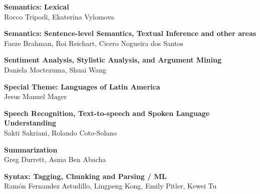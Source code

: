 \textbf{Semantics: Lexical} \\
\hspace*{0.2in} Rocco Tripodi, Ekaterina Vylomova

\textbf{Semantics: Sentence-level Semantics, Textual Inference and other areas} \\
\hspace*{0.2in} Faeze Brahman, Roi Reichart, Cicero Nogueira dos Santos

\textbf{Sentiment Analysis, Stylistic Analysis, and Argument Mining} \\
\hspace*{0.2in} Daniela Moctezuma, Shuai Wang

\textbf{Special Theme: Languages of Latin America} \\
\hspace*{0.2in} Jesus Manuel Mager

\textbf{Speech Recognition, Text-to-speech and Spoken Language Understanding} \\
\hspace*{0.2in} Sakti Sakriani, Rolando Coto-Solano

\textbf{Summarization} \\
\hspace*{0.2in} Greg Durrett, Asma Ben Abacha

\textbf{Syntax: Tagging, Chunking and Parsing / ML} \\
\hspace*{0.2in} Ram\'on Fernandez Astudillo, Lingpeng Kong, Emily Pitler, Kewei Tu
